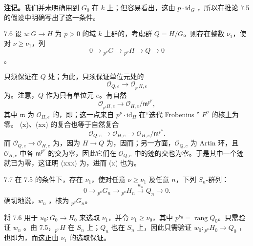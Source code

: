 \textbf{注记。}我们并未明确用到 $G_0$ 在 $k$ 上；但容易看出，这由 $p\cdot\mathrm{id}_G$ ，所以在推论 7.5 的假设中明确写出了这一条件。
\begin{SGAresult}{}{7.6}
设 $u:G\to H$ 为 $p>0$ 的域 $k$ 上群的，考虑群 $Q=H/G$。则存在整数 $\nu_1$，使对 $\nu\geq\nu_1$，列
\[
0\longrightarrow{}_{p^\nu}G\longrightarrow{}_{p^\nu}H\longrightarrow Q\longrightarrow0
\]
。
\end{SGAresult}
只须保证在 $Q$ 处；为此，只须保证单位元处的
\[
\mathcal O_{Q,e}\longrightarrow\mathcal O_{{}_{p^\nu}H,e}\tag{x}
\]
为。注意，$Q$ 作为只有单位元 $e$。有自然
\[
\mathcal O_{{}_{p^\nu}H,e}\longrightarrow\mathcal O_{H,e}/\mathfrak m^{p^\nu},\tag{xx}
\]
其中 $\mathfrak m$ 为 $\mathcal O_{H,e}$ 的，即；这一点来自 $p^\nu\cdot\mathrm{id}_H$ 在“迭代 Frobenius ” $F^\nu$ 的核上为零。 (x)、(xx) 的复合也等于自然复合
\[
\mathcal O_{Q,e}\longrightarrow\mathcal O_{H,e}\longrightarrow\mathcal O_{H,e}/\mathfrak m^{p^\nu}.\tag{xxx}
\]
而 $\mathcal O_{Q,e}\to\mathcal O_{H,e}$ 为，因为 $H\to Q$ 为，因而；另一方面，$\mathcal O_{Q,e}$ 为 Artin 环，且 $\mathcal O_{H,e}$ 中各 $\mathfrak m^{p^\nu}$ 的交为零，因此它们在 $\mathcal O_{Q,e}$ 中的迹的交也为零。于是其中一个迹就已为零，这证明 (xxx) 为，进而 (x) 也为。
\begin{SGAresult}{}{7.7}
在 7.5 的条件下，存在 $\nu_1$，使对任意 $\nu\geq\nu_1$ 及任意 $n$，下列 $S_n$-群列：
\[
0\longrightarrow{}_{p^\nu}G_n\longrightarrow{}_{p^\nu}H_n\xrightarrow{w_n}Q_n\longrightarrow0.
\]
确切地说，$w_n$ ，核为 ${}_{p^\nu}G_n$。
\end{SGAresult}
将 7.6 用于 $u_0:G_0\to H_0$ 来选取 $\nu_1$，并令 $\nu_1\geq\nu_0$，其中 $p^{\nu_0}=\operatorname{rang}Q_0$。只需验证 $w_n$ 。由 7.5，${}_{p^\nu}H$ 在 $S_n$ 上；$Q_n$ 也在 $S_n$ 上，因此只需验证 $w_0:{}_{p^\nu}H_0\to Q_0$ ，也即为，而这正由 $\nu_1$ 的选取保证。
